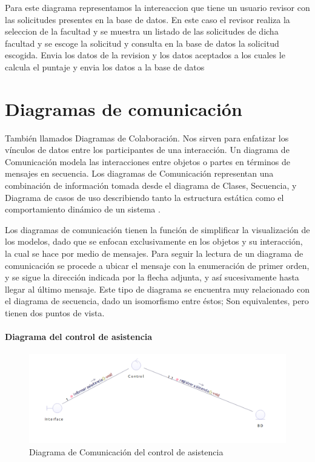Para este diagrama representamos la intereaccion que tiene un usuario revisor con las solicitudes presentes en la base de datos. En este caso el revisor realiza la seleccion de la facultad y se muestra un listado de las solicitudes de dicha facultad y se escoge la solicitud y consulta en la base de datos la solicitud escogida. Envia los datos de la revision y los datos aceptados a los cuales le calcula el puntaje y envia los datos a la base de datos

\newpage

\section{Diagramas de comunicación}

También llamados Diagramas de Colaboración. Nos sirven para enfatizar los vínculos de datos entre los participantes de una interacción. Un diagrama de Comunicación modela las interacciones entre objetos o partes en términos de mensajes en secuencia. Los diagramas de Comunicación representan una combinación de información tomada desde el diagrama de Clases, Secuencia, y Diagrama de casos de uso describiendo tanto la estructura estática como el comportamiento dinámico de un sistema \cite{Pw4DC}.

Los diagramas de comunicación tienen la función de simplificar la visualización de los modelos, dado que se enfocan exclusivamente en los objetos y su interacción, la cual se hace por medio de mensajes. Para seguir la lectura de un diagrama de comunicación se procede a ubicar el mensaje con la enumeración de primer orden, y se sigue la dirección indicada por la flecha adjunta, y así sucesivamente hasta llegar al último mensaje. Este tipo de diagrama se encuentra muy relacionado con el diagrama de secuencia, dado un isomorfismo entre éstos; Son equivalentes, pero tienen dos puntos de vista.


\paragraph{Diagrama del control de asistencia}
\begin{figure}[H]
	\centering
	\includegraphics[width=1\linewidth]{parte2/imgs/DiagramaComunicacion/ComAsist}
	\caption[Diagrama de Comunicacion Control de asistencia]{Diagrama de Comunicación del control de asistencia}
	\label{fig:diagramaDeComunicacion}
\end{figure}

